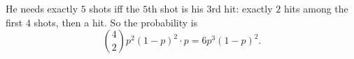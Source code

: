 He needs exactly $5$ shots iff the $5$th shot is his $3$rd hit: exactly $2$ hits among the first $4$ shots, then a hit. So the probability is
\[\binom42p^2(1-p)^2\cdot p=\boxed{6p^3(1-p)^2}.\]
